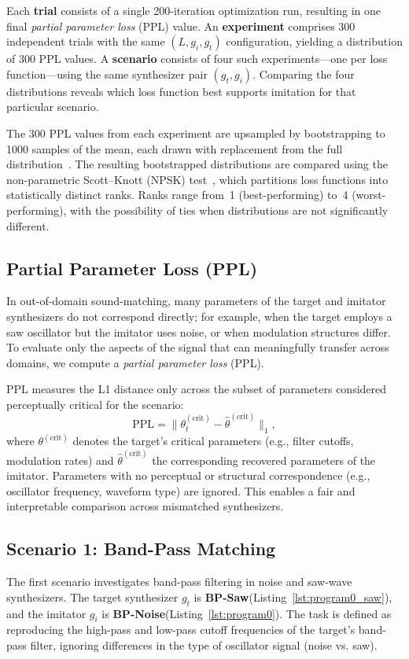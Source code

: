 \documentclass[runningheads]{llncs}
\providecommand{\gls}[1]{#1}
\newcommand{\BPNoise}{\textbf{BP-Noise}\xspace}
\newcommand{\BPSaw}{\textbf{BP-Saw}\xspace}
\begin{document}
Each \textbf{trial} consists of a single 200-iteration optimization run, resulting in one final \textit{partial parameter loss} (PPL) value.  
An \textbf{experiment} comprises 300 independent trials with the same $(L, g_i, g_t)$ configuration, yielding a distribution of 300 PPL values.  
A \textbf{scenario} consists of four such experiments—one per loss function—using the same synthesizer pair $(g_t, g_i)$.  
Comparing the four distributions reveals which loss function best supports imitation for that particular scenario.

The 300 PPL values from each experiment are upsampled by bootstrapping to 1000 samples of the mean, each drawn with replacement from the full distribution~\cite{tibshirani1993introduction,chernick2011bootstrap}.  
The resulting bootstrapped distributions are compared using the non-parametric Scott–Knott (\gls{NPSK}) test~\cite{tantithamthavorn2017mvt,tantithamthavorn2018optimization}, which partitions loss functions into statistically distinct ranks.  
Ranks range from~1 (best-performing) to~4 (worst-performing), with the possibility of ties when distributions are not significantly different.

\subsection{Partial Parameter Loss (PPL)}
In out-of-domain sound-matching, many parameters of the target and imitator synthesizers do not correspond directly; for example, when the target employs a saw oscillator but the imitator uses noise, or when modulation structures differ.  
To evaluate only the aspects of the signal that can meaningfully transfer across domains, we compute a \emph{partial parameter loss} (PPL).  

PPL measures the L1 distance only across the subset of parameters considered perceptually critical for the scenario:
\begin{equation}
\mathrm{PPL} = \| \theta^{(\mathrm{crit})}_t - \hat{\theta}^{(\mathrm{crit})} \|_1,
\end{equation}
where $\theta^{(\mathrm{crit})}$ denotes the target’s critical parameters (e.g., filter cutoffs, modulation rates) and $\hat{\theta}^{(\mathrm{crit})}$ the corresponding recovered parameters of the imitator.  
Parameters with no perceptual or structural correspondence (e.g., oscillator frequency, waveform type) are ignored.  
This enables a fair and interpretable comparison across mismatched synthesizers.

\subsection{Scenario 1: Band-Pass Matching}
The first scenario investigates band-pass filtering in noise and saw-wave synthesizers.  
The target synthesizer $g_t$ is \BPSaw (Listing~\ref{lst:program0_saw}), and the imitator $g_i$ is \BPNoise (Listing~\ref{lst:program0}).  
The task is defined as reproducing the high-pass and low-pass cutoff frequencies of the target’s band-pass filter, ignoring differences in the type of oscillator signal (noise vs. saw). 
\end{document}
